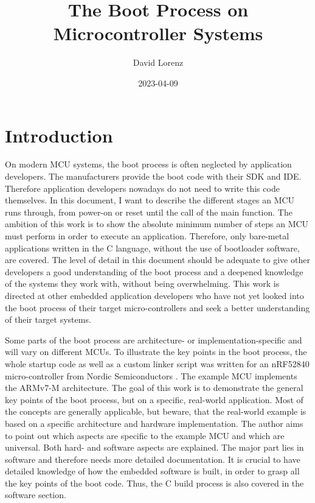 \documentclass[a4paper,12pt]{article}
\author{David Lorenz}
\title{The Boot Process on Microcontroller Systems}
\date{2023-04-09}
\begin{document}
\maketitle
\thispagestyle{empty}
\newpage
\tableofcontents
\newpage

\section{Introduction}\label{sec:introduction}
On modern \ac{MCU} systems, the boot process is often neglected by application developers. The manufacturers provide the boot code with their \ac{SDK} and \ac{IDE}. Therefore application developers nowadays do not need to write this code themselves. In this document, I want to describe the different stages an \ac{MCU} runs through, from power-on or reset until the call of the main function. The ambition of this work is to show the absolute minimum number of steps an \ac{MCU} must perform in order to execute an application. Therefore, only bare-metal applications written in the C language, without the use of bootloader software, are covered. The level of detail in this document should be adequate to give other developers a good understanding of the boot process and a deepened knowledge of the systems they work with, without being overwhelming. This work is directed at other embedded application developers who have not yet looked into the boot process of their target micro-controllers and seek a better understanding of their target systems.
\par Some parts of the boot process are architecture- or implementation-specific and will vary on different \ac{MCU}s. To illustrate the key points in the boot process, the whole startup code as well as a custom linker script was written for an nRF52840 micro-controller from Nordic Semiconductors \cite{nrf52840Specification}. The example \ac{MCU} implements the ARMv7-M architecture. The goal of this work is to demonstrate the general key points of the boot process, but on a specific, real-world application. Most of the concepts are generally applicable, but beware, that the real-world example is based on a specific architecture and hardware implementation. The author aims to point out which aspects are specific to the example \ac{MCU} and which are universal. Both hard- and software aspects are explained. The major part lies in software and therefore needs more detailed documentation. It is crucial to have detailed knowledge of how the embedded software is built, in order to grasp all the key points of the boot code. Thus, the C build process is also covered in the software section.
\newpage
\end{document}

